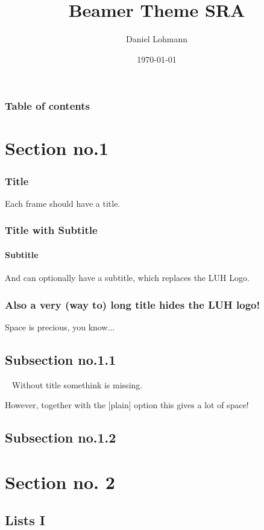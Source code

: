 \documentclass{beamer}
\begin{document}
\title{Beamer Theme SRA}
\author[dl]{Daniel Lohmann}
\date{\today}

\begin{frame}[title]
	\titlepage
\end{frame}

\begin{frame}\frametitle{Table of contents}\tableofcontents
\end{frame}


\section{Section no.1}

\begin{frame}
	\frametitle{Title}
	Each frame should have a title.
\end{frame}

\begin{frame}
	\frametitle{Title with Subtitle}
	\framesubtitle{Subtitle}
	And can optionally have a subtitle, which replaces the LUH Logo.
\end{frame}

\begin{frame}
	\frametitle{Also a very (way to) long title hides the LUH logo!}
	Space is precious, you know...
\end{frame}

\subsection{Subsection no.1.1  }

\begin{frame}{~}
	Without title somethink is missing.
\end{frame}

\begin{frame}[plain]{}
	However, together with the [plain] option this gives a lot of space!
\end{frame}

\subsection{Subsection no.1.2}

\section{Section no. 2}

\subsection{Lists I}
\end{document}
